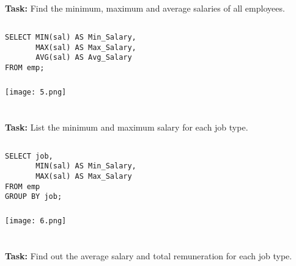 \documentclass[12pt,a4paper]{article}
\begin{document}

\section{}
\textbf{Task:} Find the minimum, maximum and average salaries of all employees.

\subsection{}
\begin{lstlisting}
SELECT MIN(sal) AS Min_Salary,
       MAX(sal) AS Max_Salary,
       AVG(sal) AS Avg_Salary
FROM emp;
\end{lstlisting}

\subsubsection{}
\begin{center}
    \texttt{[image: 5.png]}
\end{center}


\section{}
\textbf{Task:} List the minimum and maximum salary for each job type.

\subsection{}
\begin{lstlisting}
SELECT job,
       MIN(sal) AS Min_Salary,
       MAX(sal) AS Max_Salary
FROM emp
GROUP BY job;
\end{lstlisting}

\subsubsection{}
\begin{center}
    \texttt{[image: 6.png]}
\end{center}


\section{}
\textbf{Task:} Find out the average salary and total remuneration for each job type.
\end{document}
